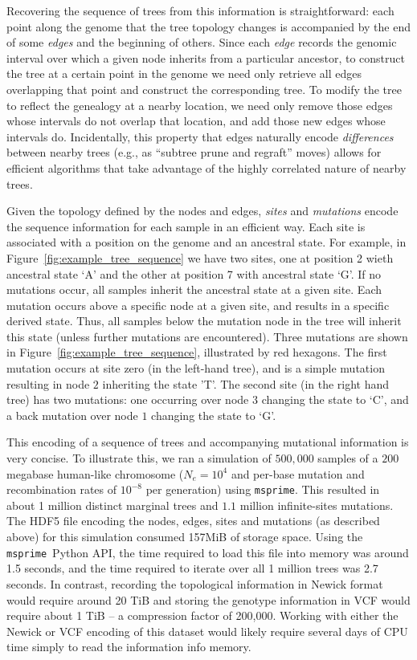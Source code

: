 \documentclass{article}
\newcommand{\msprime}{\texttt{msprime}}
\begin{document}
Recovering the sequence of trees from this information is straightforward:
each point along the genome that the tree topology changes
is accompanied by the end of some \emph{edges} and the beginning of others.
Since each \emph{edge} records the genomic interval 
over which a given node inherits from a particular ancestor,
to construct the tree at a certain point in the genome
we need only retrieve all edges overlapping that point
and construct the corresponding tree.
To modify the tree to reflect the genealogy at a nearby location,
we need only remove those edges whose intervals do not overlap that location,
and add those new edges whose intervals do.
Incidentally, this property that edges naturally encode \emph{differences}
between nearby trees (e.g., as ``subtree prune and regraft'' moves)
allows for efficient algorithms that take advantage
of the highly correlated nature of nearby trees.

Given the topology defined by the nodes and edges, \emph{sites} and \emph{mutations}
encode the sequence information for each sample in an efficient way. Each site
is associated with a position on the genome and an ancestral state. For example,
in Figure~\ref{fig:example_tree_sequence} we have two sites, one at position
2 wieth ancestral state `A' and the other at position 7 with ancestral state `G'. If
no mutations occur, all samples inherit the ancestral state at a given site.
Each mutation occurs above a specific node at a given site, 
and results in a specific derived state. 
Thus, all samples below the mutation node in the tree will inherit this state 
(unless further mutations are encountered). 
Three mutations are shown in Figure~\ref{fig:example_tree_sequence}, 
illustrated by red hexagons. 
The first mutation occurs at site zero (in the left-hand tree), and is a simple
mutation resulting in node $2$ inheriting the state 'T'. 
The second site (in the right hand tree) has two mutations: 
one occurring over node $3$ changing the state to `C', 
and a back mutation over node $1$ changing the state to `G'.

This encoding of a sequence of trees and accompanying mutational information is
very concise. To illustrate this, we ran a simulation of $500,000$ samples of a
$200$ megabase human-like chromosome ($N_e=10^4$ and per-base mutation and
recombination rates of $10^{-8}$ per generation) using \msprime. This resulted
in about 1 million distinct marginal trees and $1.1$ million infinite-sites
mutations. The HDF5 file encoding the nodes, edges, sites and mutations (as
described above) for this simulation consumed 157MiB of storage space. Using
the \msprime\ Python API, the time required to load this file into memory was
around 1.5 seconds, and the time required to iterate over all 1 million trees
was 2.7 seconds. In contrast, recording the topological information in Newick
format would require around 20 TiB and storing the genotype information
in VCF would require about 1 TiB --
a compression factor of 200,000.
Working with either the Newick or VCF encoding
of this dataset would likely require several
days of CPU time simply to read the information info memory.
\end{document}
